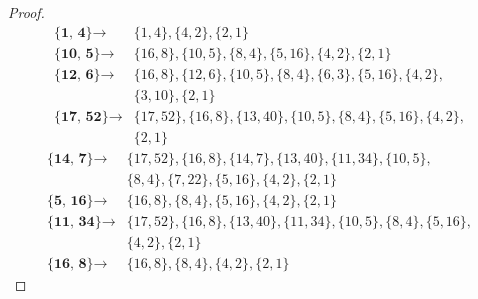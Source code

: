 \documentclass{jams-l}
\theoremstyle{definition}
\theoremstyle{remark}
\numberwithin{equation}{section}
\begin{document}
\begin{proof}
\begin{align}
                \textbf{\{1, 4\}} \rightarrow &\{1, 4\},\{4, 2\},\{2, 1\}\\
                \textbf{\{10, 5\}} \rightarrow &\{16, 8\},\{10, 5\},\{8, 4\},\{5, 16\},\{4, 2\},\{2, 1\}\\
                \textbf{\{12, 6\}} \rightarrow &\{16, 8\},\{12, 6\},\{10, 5\},\{8, 4\},\{6, 3\},\{5, 16\},\{4, 2\},\\ \nonumber &\{3, 10\},\{2, 1\}\\
                \textbf{\{17, 52\}} \rightarrow &\{17, 52\},\{16, 8\},\{13, 40\},\{10, 5\},\{8, 4\},\{5, 16\},\{4, 2\},\\ \nonumber &\{2, 1\}
            \end{align}
    		\begin{align}
                \textbf{\{14, 7\}} \rightarrow &\{17, 52\},\{16, 8\},\{14, 7\},\{13, 40\},\{11, 34\},\{10, 5\},\\ \nonumber &\{8, 4\},\{7, 22\},\{5, 16\},\{4, 2\},\{2, 1\}\\
    			\textbf{\{5, 16\}} \rightarrow &\{16, 8\},\{8, 4\},\{5, 16\},\{4, 2\},\{2, 1\}\\
    			\textbf{\{11, 34\}} \rightarrow &\{17, 52\},\{16, 8\},\{13, 40\},\{11, 34\},\{10, 5\},\{8, 4\},\{5, 16\},\\ \nonumber &\{4, 2\},\{2, 1\}\\
    			\textbf{\{16, 8\}} \rightarrow &\{16, 8\},\{8, 4\},\{4, 2\},\{2, 1\}
       		\end{align}
    	\end{proof}
    
\end{document}
